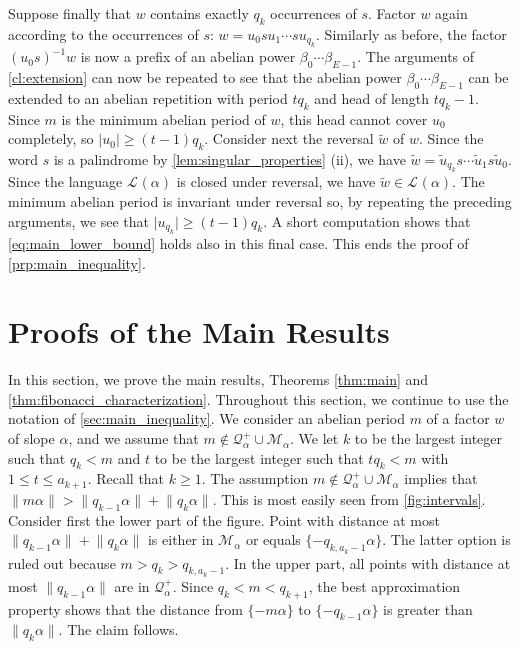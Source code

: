 \documentclass[a4paper,fleqn]{article}
\providecommand{\abs}[1]{\lvert#1\rvert}
\providecommand{\norm}[1]{\lVert#1\rVert}
\newcommand{\Lang}[2][]{\mathcal{L}_{#1}(#2)}
\newcommand{\mirror}[1]{\widetilde{#1}}
\newcommand{\qkl}[1]{\mathcal{Q}^+_{#1}}
\begin{document}
  Suppose finally that $w$ contains exactly $q_k$ occurrences of $s$. Factor $w$ again according to the occurrences of
  $s$: $w = u_0 s u_1 \dotsm s u_{q_k}$. Similarly as before, the factor $(u_0 s)^{-1} w$ is now a prefix of an abelian
  power $\beta_0 \dotsm \beta_{E-1}$. The arguments of \autoref{cl:extension} can now be repeated to see that the
  abelian power $\beta_0 \dotsm \beta_{E-1}$ can be extended to an abelian repetition with period $tq_k$ and head of
  length $tq_k - 1$. Since $m$ is the minimum abelian period of $w$, this head cannot cover $u_0$ completely, so
  $\abs{u_0} \geq (t - 1)q_k$. Consider next the reversal $\mirror{w}$ of $w$. Since the word $s$ is a palindrome by
  \autoref{lem:singular_properties} (ii), we have $\mirror{w} = \mirror{u}_{q_k} s \dotsm \mirror{u}_1 s \mirror{u}_0$.
  Since the language $\Lang{\alpha}$ is closed under reversal, we have $\mirror{w} \in \Lang{\alpha}$. The minimum
  abelian period is invariant under reversal so, by repeating the preceding arguments, we see that
  $\abs{u_{q_k}} \geq (t - 1)q_k$. A short computation shows that \eqref{eq:main_lower_bound} holds also in this final
  case. This ends the proof of \autoref{prp:main_inequality}.

  \section{Proofs of the Main Results}\label{sec:main_proofs}
  In this section, we prove the main results, Theorems \ref{thm:main} and \ref{thm:fibonacci_characterization}.
  Throughout this section, we continue to use the notation of \autoref{sec:main_inequality}. We consider an abelian
  period $m$ of a factor $w$ of slope $\alpha$, and we assume that $m \notin \qkl{\alpha} \cup \mathcal{M}_\alpha$. We
  let $k$ to be the largest integer such that $q_k < m$ and $t$ to be the largest integer such that $tq_k < m$ with
  $1 \leq t \leq a_{k+1}$. Recall that $k \geq 1$. The assumption $m \notin \qkl{\alpha} \cup \mathcal{M}_\alpha$
  implies that $\norm{m\alpha} > \norm{q_{k-1}\alpha} + \norm{q_k\alpha}$. This is most easily seen from
  \autoref{fig:intervals}. Consider first the lower part of the figure. Point with distance at most 
  $\norm{q_{k-1}\alpha} + \norm{q_k\alpha}$ is either in $\mathcal{M}_\alpha$ or equals $\{-q_{k,a_k-1}\alpha\}$. The
  latter option is ruled out because $m > q_k > q_{k,a_k-1}$. In the upper part, all points with distance at most
  $\norm{q_{k-1}\alpha}$ are in $\qkl{\alpha}$. Since $q_k < m < q_{k+1}$, the best approximation property shows that
  the distance from $\{-m\alpha\}$ to $\{-q_{k-1}\alpha\}$ is greater than $\norm{q_k\alpha}$. The claim follows.
\end{document}
